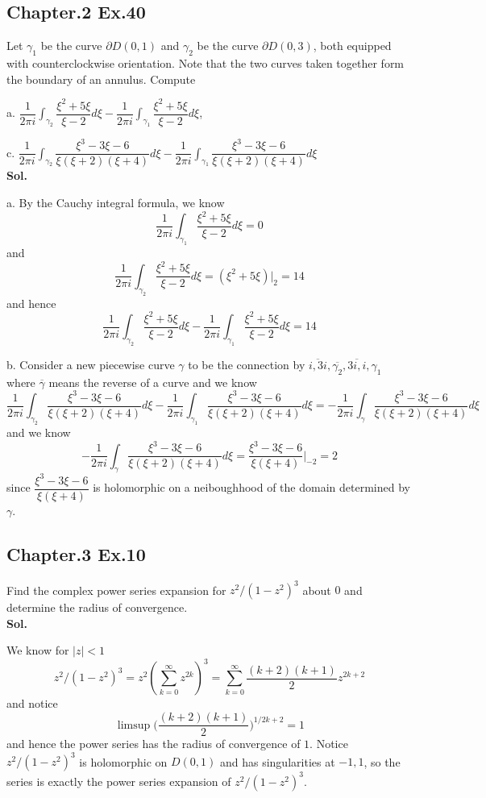 \documentclass[lang=en,11pt,a4paper,citestyle =authoryear]{elegantpaper}
\begin{document}
\subsection*{Chapter.2 Ex.40} 
Let $\gamma_1$ be the curve $\partial D(0,1)$ and $\gamma_2$ be the curve $\partial D(0,3)$, both equipped with counterclockwise orientation. Note that the two curves taken together form the boundary of an annulus. Compute\par
a. $\dfrac{1}{2\pi i}\int_{\gamma_2}\dfrac{\xi^2+5\xi}{\xi-2} d\xi - \dfrac{1}{2\pi i}\int_{\gamma_1}\dfrac{\xi^2+5\xi}{\xi-2} d\xi$,\par
c. $\dfrac{1}{2\pi i}\int_{\gamma_2}\dfrac{\xi^3-3\xi-6}{\xi(\xi+2)(\xi+4)} d\xi - \dfrac{1}{2\pi i}\int_{\gamma_1}\dfrac{\xi^3-3\xi-6}{\xi(\xi+2)(\xi+4)}d\xi$
\vspace{0.5em}\\
\textbf{Sol.} \par
a. By the Cauchy integral formula, we know
\[\dfrac{1}{2\pi i}\int_{\gamma_1}\dfrac{\xi^2+5\xi}{\xi-2} d\xi = 0\]
and
\[
\dfrac{1}{2\pi i}\int_{\gamma_2}\dfrac{\xi^2+5\xi}{\xi-2} d\xi = (\xi^2+5\xi)|_2 = 14
\]
and hence
\[\dfrac{1}{2\pi i}\int_{\gamma_2}\dfrac{\xi^2+5\xi}{\xi-2} d\xi - \dfrac{1}{2\pi i}\int_{\gamma_1}\dfrac{\xi^2+5\xi}{\xi-2} d\xi = 14\]\par
b. Consider a new piecewise curve $\gamma$ to be the connection by $\overline{i, 3i},\overline{\gamma_2},\overline{3i,i},\gamma_1$ where $\overline{\gamma}$ means the reverse of a curve and we know
\[
\dfrac{1}{2\pi i}\int_{\gamma_2}\dfrac{\xi^3-3\xi-6}{\xi(\xi+2)(\xi+4)} d\xi - \dfrac{1}{2\pi i}\int_{\gamma_1}\dfrac{\xi^3-3\xi-6}{\xi(\xi+2)(\xi+4)}d\xi = -\dfrac{1}{2\pi i}\int_{\gamma}\dfrac{\xi^3-3\xi-6}{\xi(\xi+2)(\xi+4)} d\xi 
\]
and we know
\[
-\dfrac{1}{2\pi i}\int_{\gamma}\dfrac{\xi^3-3\xi-6}{\xi(\xi+2)(\xi+4)} d\xi = \dfrac{\xi^3-3\xi-6}{\xi(\xi+4)}|_{-2} = 2
\]
since $\dfrac{\xi^3-3\xi-6}{\xi(\xi+4)}$ is holomorphic on a neiboughhood of the domain determined by $\gamma$.
\vspace{0.5em}

\subsection*{Chapter.3 Ex.10} 
Find the complex power series expansion for $z^2/(1-z^2)^3$ about $0$ and determine the radius of convergence.
\vspace{0.5em}\\
\textbf{Sol.} \par
We know for $|z|<1$
\[
z^2/(1-z^2)^3 = z^2(\sum\limits_{k=0}^{\infty} z^{2k})^3 = \sum\limits_{k=0}^{\infty}\dfrac{(k+2)(k+1)}{2}z^{2k+2}
\]
and notice
\[
\limsup \Big(\dfrac{(k+2)(k+1)}{2}\Big)^{1/2k+2} = 1
\]
and hence the power series has the radius of convergence of $1$. Notice $z^2/(1-z^2)^3$ is holomorphic on $D(0,1)$ and has singularities at $-1,1$, so the series is exactly the power series expansion of $z^2/(1-z^2)^3$.
\par
\vspace{0.5em}
\end{document}
